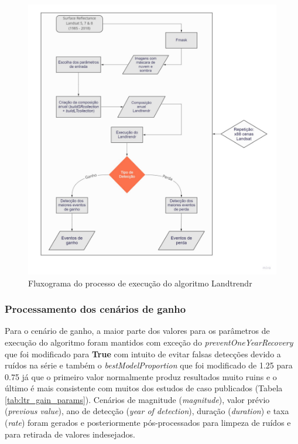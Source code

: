 \begin{figure}[H]
    \centering
    \includegraphics[scale=.5]{images/flowchart_medologia_landtrendr.pdf}
    \caption{Fluxograma do processo de execução do algoritmo Landtrendr}
    \label{fig:flowchart_medologia_landtrendr}
\end{figure}

\subsubsection{Processamento dos cenários de ganho}

\hspace{13pt} Para o cenário de ganho, a maior parte dos valores para os parâmetros de execução do algoritmo foram mantidos com exceção do \textit{preventOneYearRecovery} que foi modificado para \textbf{True} com intuito de evitar falsas detecções devido a ruídos na série e também o \textit{bestModelProportion} que foi modificado de 1.25 para 0.75 já que o primeiro valor normalmente produz resultados muito ruins e o último é mais consistente com muitos dos estudos de caso publicados \citep{HISLOP2019188, SHIMIZU201999, YANG2018353, DEMARZO2021102310, GELABERT2021112521, MURILLOSANDOVAL2021102283, YE2021101221, rs12101612, f11030362, land9010027, senf_mapping_2021} (Tabela \ref{tab:ltr_gain_params}). Cenários de magnitude (\textit{magnitude}), valor prévio (\textit{previous value}), ano de detecção (\textit{year of detection}), duração (\textit{duration}) e taxa (\textit{rate}) foram gerados e posteriormente pós-processados para limpeza de ruídos e para retirada de valores indesejados. 

